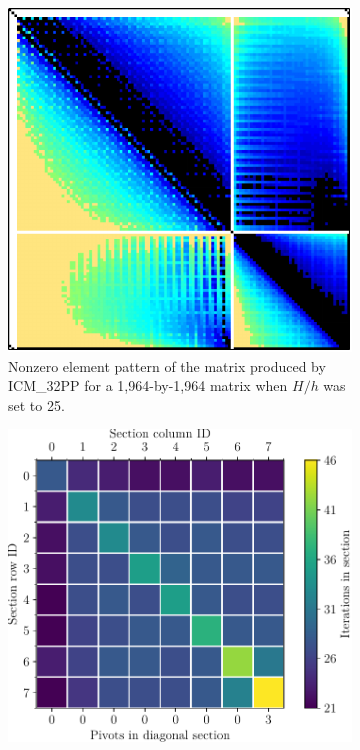 \begin{figure}[ht!]
	\centering
	\begin{subfigure}[t]{0.45\textwidth}
		\centering
		\includegraphics[width=\textwidth]{images/ch03/input-matrices/bddcml-benchmark/poc-25_4_2-LU_ICM32PP.pdf}
		\caption{Nonzero element pattern of the  matrix produced by ICM\_32PP for a 1,964-by-1,964 matrix when $H/h$ was set to 25.}
		\label{Figure:comparing-decomposers-and-solvers->bddcml-benchmark->benchmark-results->speedup-comparison-of-decomposers-in-pc-setup-stage->speedup-comparison->ICM_32PP->25-4-2->LU}
	\end{subfigure}%
	\hspace{0.03\textwidth}
	\begin{subfigure}[t]{0.51\textwidth}
		\centering
		\includegraphics[width=\textwidth]{images/ch03/input-matrices/bddcml-benchmark/poc-25_4_2_icm32pp_metrics.pdf}

\end{subfigure}
\end{figure}
